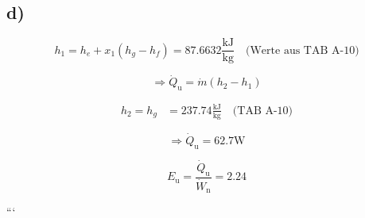 

\subsection*{d)}
\[
    h_{1} = h_{e} + x_{1} (h_{g} - h_{f}) = 87.6632 \frac{\text{kJ}}{\text{kg}} \quad \text{(Werte aus TAB A-10)}
\]

\[
    \Rightarrow \dot{Q}_{\text{u}} = \dot{m} (h_{2} - h_{1})
\]

\begin{align*}
    h_{2} = h_{g} &= 237.74 \frac{\text{kJ}}{\text{kg}} \quad \text{(TAB A-10)}
\end{align*}

\[
    \Rightarrow \dot{Q}_{\text{u}} = 62.7 \text{W}
\]

\[
    E_{\text{u}} = \frac{\dot{Q}_{\text{u}}}{\dot{W}_{\text{n}}} = 2.24
\]

```